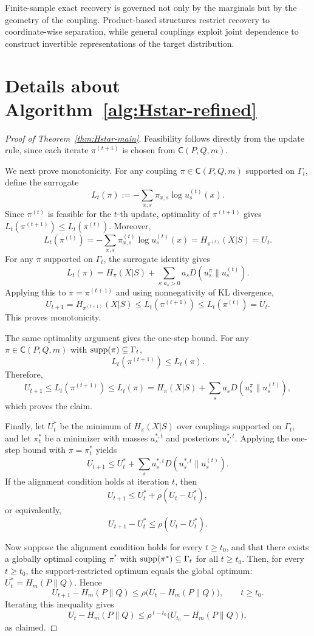 \documentclass[journal]{IEEEtran}
\def\supp{\mathop{\rm supp}}
\newcommand{\1}{\mathbf{1}}
\begin{document}
Finite-sample exact recovery is governed not only by the marginals but by the geometry of the coupling. Product-based structures restrict recovery to coordinate-wise separation, while general couplings exploit joint dependence to construct invertible representations of the target distribution.





\section{Details about Algorithm~\ref{alg:Hstar-refined}}\label{app:list-coupling2}

\begin{proof}[Proof of Theorem~\ref{thm:Hstar-main}]
Feasibility follows directly from the update rule, since each iterate
\(\pi^{(t+1)}\) is chosen from \(\mathsf C(P,Q,m)\).

We next prove monotonicity. For any coupling
\(\pi\in\mathsf C(P,Q,m)\) supported on \(\Gamma_t\), define the surrogate
\[
L_t(\pi):=
-\sum_{x,s}\pi_{x,s}\log u_s^{(t)}(x).
\]
Since \(\pi^{(t)}\) is feasible for the \(t\)-th update, optimality of
\(\pi^{(t+1)}\) gives
\(L_t(\pi^{(t+1)}) \le L_t(\pi^{(t)}).\)
Moreover,
\[
L_t(\pi^{(t)})
=
-\sum_{x,s}\pi^{(t)}_{x,s}\log u_s^{(t)}(x)
=
H_{\pi^{(t)}}(X| S)
=
U_t.
\]
For any \(\pi\) supported on \(\Gamma_t\), the surrogate identity gives
\[
L_t(\pi)
=
H_\pi(X| S)
+
\sum_{s:a_s>0}a_sD(u_s^\pi\|u_s^{(t)}).
\]
Applying this to \(\pi=\pi^{(t+1)}\) and using nonnegativity of KL divergence,
\[
U_{t+1}
=
H_{\pi^{(t+1)}}(X| S)
\le
L_t(\pi^{(t+1)})
\le
L_t(\pi^{(t)})
=
U_t.
\]
This proves monotonicity.

The same optimality argument gives the one-step bound. For any
\(\pi\in\mathsf C(P,Q,m)\) with \(\supp(\pi)\subseteq\Gamma_t\),
\[
L_t(\pi^{(t+1)})\le L_t(\pi).
\]
Therefore,
\[
U_{t+1}
\le
L_t(\pi^{(t+1)})
\le
L_t(\pi)
=
H_\pi(X| S)
+
\sum_s a_sD(u_s^\pi\|u_s^{(t)}),
\]
which proves the claim.

Finally, let \(U_t^*\) be the minimum of \(H_\pi(X| S)\) over couplings
supported on \(\Gamma_t\), and let \(\pi_t^*\) be a minimizer with masses
\(a_s^{*,t}\) and posteriors \(u_s^{*,t}\). Applying the one-step bound with
\(\pi=\pi_t^*\) yields
\[
U_{t+1}
\le
U_t^*
+
\sum_s a_s^{*,t}D(u_s^{*,t}\|u_s^{(t)}).
\]
If the alignment condition holds at iteration \(t\), then
\[
U_{t+1}
\le
U_t^*+\rho(U_t-U_t^*),
\]
or equivalently,
\[
U_{t+1}-U_t^*
\le
\rho(U_t-U_t^*).
\]

Now suppose the alignment condition holds for every \(t\ge t_0\), and that
there exists a globally optimal coupling \(\pi^*\) with
\(\supp(\pi^*)\subseteq\Gamma_t\) for all \(t\ge t_0\). Then, for every
\(t\ge t_0\), the support-restricted optimum equals the global optimum:
\(U_t^*=H_m(P\|Q).\)
Hence
\[
U_{t+1}-H_m(P\|Q)
\le
\rho\bigl(U_t-H_m(P\|Q)\bigr),
\qquad t\ge t_0.
\]
Iterating this inequality gives
\[
U_t-H_m(P\|Q)
\le
\rho^{\,t-t_0}
\bigl(U_{t_0}-H_m(P\|Q)\bigr),
\]
as claimed.
\end{proof}
\end{document}
